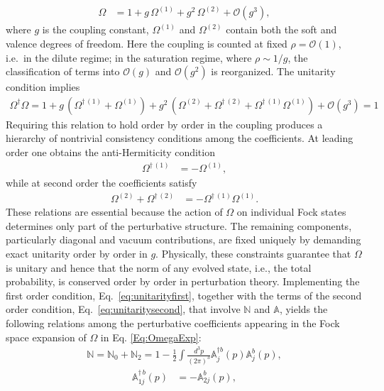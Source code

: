 \documentclass[a4paper,11pt]{article}
\def\mf#1{\mathbb{#1}}
\begin{document}
\begin{align}
    \Omega & = 1 + g\,\Omega^{(1)} + g^{2}\, \Omega^{(2)} + \mathcal{O}(g^{3}),
\end{align}
where $g$ is the coupling constant, $\Omega^{(1)}$ and $\Omega^{(2)}$ contain both the soft and valence degrees of freedom. {\color{chg}Here the coupling is counted at fixed $\rho=\mathcal{O}(1)$, i.e.\ in the dilute regime; in the saturation regime, where $\rho\sim1/g$, the classification of terms into $\mathcal{O}(g)$ and $\mathcal{O}(g^{2})$ is reorganized.} The unitarity condition implies
\begin{align}
    \Omega^{\dagger}\Omega = 1 + g\,\left(\Omega^{\dagger\, (1)} + \Omega^{(1)}\right) + g^{2}\, \left(\Omega^{(2)} + \Omega^{\dagger\, (2)}+ \Omega^{\dagger\,(1)}\Omega^{(1)}\right) + \mathcal{O}(g^{3}) = 1
\end{align}
Requiring this relation to hold order by order in the coupling produces a hierarchy of nontrivial consistency conditions among the coefficients. At leading order one obtains the anti-Hermiticity condition
\begin{align} \label{eq:unitarityfirst}
    \Omega^{\dagger\, (1)} & = -\Omega^{(1)},
\end{align}
while at second order the coefficients satisfy
\begin{align}\label{eq:unitaritysecond}
    \Omega^{(2)} + \Omega^{\dagger\, (2)} & = - \Omega^{\dagger\,(1)}\Omega^{(1)}. 
\end{align}
These relations are essential because the action of $\Omega$ on individual Fock states determines only part of the perturbative structure. The remaining components, particularly diagonal and vacuum contributions, are fixed uniquely by demanding exact unitarity order by order in $g$. Physically, these constraints guarantee that $\Omega$ is unitary and hence that the norm of any evolved state, i.e., the total probability, is conserved order by order in perturbation theory. Implementing the first order condition, Eq.~\eqref{eq:unitarityfirst}, together with the terms of the second order condition, Eq.~\eqref{eq:unitaritysecond}, that involve $\mf{N}$ and $\mf{A}$, yields the following relations among the perturbative coefficients appearing in the Fock space expansion of $\Omega$ in Eq. \eqref{Eq:OmegaExp}:
\begin{align}
 \mf{N} = \mf{N}_{0} + \mf{N}_{2}   = 1-  \frac{1}{2}\int \frac{d^{3}p}{(2\pi)^{3}} \mf{A}^{\dagger b}_{j}(p) \mf{A}^{b}_{j}(p),
 \end{align}
 \begin{align}
 \mf{A}^{\dagger\,  b}_{1j}(p) & =  -\mf{A}^{b}_{2j}(p),
 \end{align}
\end{document}
